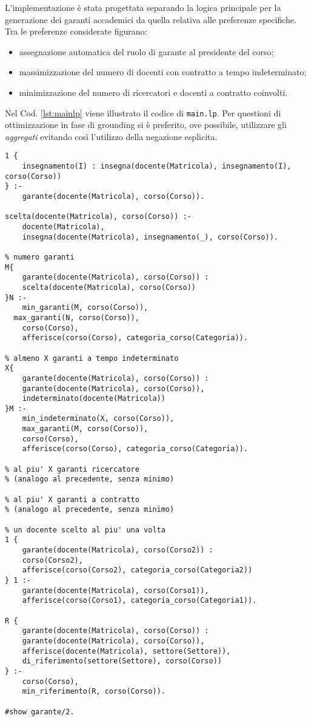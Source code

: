 L'implementazione è stata progettata separando la logica principale per la
generazione dei garanti accademici da quella relativa alle preferenze
specifiche. Tra le preferenze considerate figurano:  
\begin{itemize}
	\item assegnazione automatica del ruolo di garante al presidente del corso;
	\item massimizzazione del numero di docenti con contratto a tempo indeterminato;
	\item minimizzazione del numero di ricercatori e docenti a contratto coinvolti.
\end{itemize}

Nel Cod. \ref{lst:mainlp} viene illustrato il codice di \texttt{main.lp}. Per
questioni di ottimizzazione in fase di grounding si è preferito, ove possibile, utilizzare gli
\textit{aggregati} evitando così l'utilizzo della negazione esplicita.

\begin{center}
\begin{lstlisting}[style=asp, caption={Codice ASP del file \texttt{main.lp}.}, label={lst:mainlp}]
% se garante allora insegna almeno una materia
1 {
    insegnamento(I) : insegna(docente(Matricola), insegnamento(I), corso(Corso))
} :-
    garante(docente(Matricola), corso(Corso)).

scelta(docente(Matricola), corso(Corso)) :-
	docente(Matricola),
	insegna(docente(Matricola), insegnamento(_), corso(Corso)).

% numero garanti
M{
	garante(docente(Matricola), corso(Corso)) :
	scelta(docente(Matricola), corso(Corso))
}N :-
	min_garanti(M, corso(Corso)),
  max_garanti(N, corso(Corso)),
	corso(Corso),
	afferisce(corso(Corso), categoria_corso(Categoria)).

% almeno X garanti a tempo indeterminato
X{
	garante(docente(Matricola), corso(Corso)) :
	garante(docente(Matricola), corso(Corso)),
	indeterminato(docente(Matricola))
}M :-
	min_indeterminato(X, corso(Corso)),
	max_garanti(M, corso(Corso)),
	corso(Corso),
	afferisce(corso(Corso), categoria_corso(Categoria)).

% al piu' X garanti ricercatore
% (analogo al precedente, senza minimo)

% al piu' X garanti a contratto
% (analogo al precedente, senza minimo)

% un docente scelto al piu' una volta
1 {
    garante(docente(Matricola), corso(Corso2)) :
    corso(Corso2),
    afferisce(corso(Corso2), categoria_corso(Categoria2))
} 1 :-
    garante(docente(Matricola), corso(Corso1)),
    afferisce(corso(Corso1), categoria_corso(Categoria1)).

R {
    garante(docente(Matricola), corso(Corso)) :
    garante(docente(Matricola), corso(Corso)),
    afferisce(docente(Matricola), settore(Settore)),
    di_riferimento(settore(Settore), corso(Corso))
} :-
    corso(Corso),
    min_riferimento(R, corso(Corso)).

#show garante/2.
\end{lstlisting}
\end{center}

